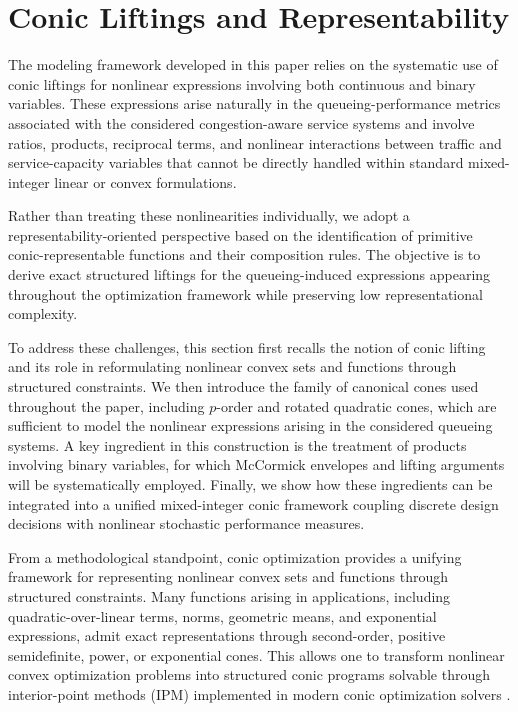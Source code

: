 \documentclass[a4paper,11pt,reqno]{amsart}
\begin{document}

\section{Conic Liftings and Representability}\label{sec:MBC}

The modeling framework developed in this paper relies on the systematic use of conic liftings for nonlinear expressions involving both continuous and binary variables. These expressions arise naturally in the queueing-performance metrics associated with the considered congestion-aware service systems and involve ratios, products, reciprocal terms, and nonlinear interactions between traffic and service-capacity variables that cannot be directly handled within standard mixed-integer linear or convex formulations.

Rather than treating these nonlinearities individually, we adopt a representability-oriented perspective based on the identification of primitive conic-representable functions and their composition rules. The objective is to derive exact structured liftings for the queueing-induced expressions appearing throughout the optimization framework while preserving low representational complexity.

To address these challenges, this section first recalls the notion of conic lifting and its role in reformulating nonlinear convex sets and functions through structured constraints. We then introduce the family of canonical cones used throughout the paper, including $p$-order and rotated quadratic cones, which are sufficient to model the nonlinear expressions arising in the considered queueing systems. A key ingredient in this construction is the treatment of products involving binary variables, for which McCormick envelopes and lifting arguments will be systematically employed. Finally, we show how these ingredients can be integrated into a unified mixed-integer conic framework coupling discrete design decisions with nonlinear stochastic performance measures.

From a methodological standpoint, conic optimization provides a unifying framework for representing nonlinear convex sets and functions through structured constraints. Many functions arising in applications, including quadratic-over-linear terms, norms, geometric means, and exponential expressions, admit exact representations through second-order, positive semidefinite, power, or exponential cones. This allows one to transform nonlinear convex optimization problems into structured conic programs solvable through interior-point methods (IPM) implemented in modern conic optimization solvers \citep{BenTalNemirovski2001,BoydVandenberghe2004}.
\end{document}

